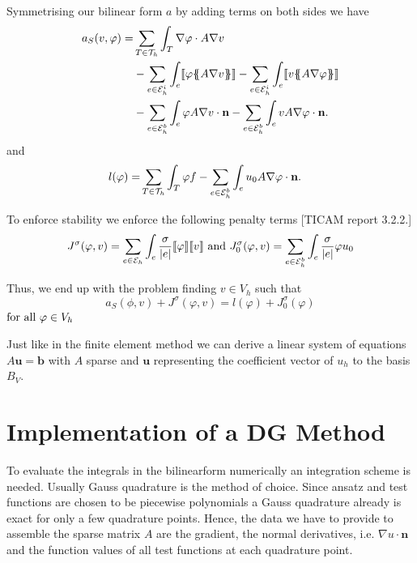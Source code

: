 Symmetrising our bilinear form $a$ by adding terms on both sides we have
\begin{align}
 a_S(v, \varphi) = &\sum\limits_{T \in \triang} \int_T \nabla \varphi \cdot A \nabla v \nonumber \\
  &-\sum\limits_{e \in \edgesi}\int_{e} \jump {\varphi \average{A \nabla v} }
 - \sum\limits_{e \in \edgesi}\int_{e} \jump{ v \average{ A \nabla \varphi}} \nonumber\\ 
 & - \sum\limits_{e \in \edgesb}\int_{e} \varphi A \nabla v \cdot \mathbf n 
    - \sum\limits_{e \in \edgesb}\int_{e} v A \nabla \varphi \cdot \mathbf n.
\end{align}
and 
\begin{align}
	l(\varphi) =& \sum\limits_{T \in \mathcal{T}_h} \int_T \varphi f -\sum\limits_{e \in \mathcal{E}_h^b}\int_{e} u_0 A \nabla \varphi \cdot \mathbf n.
\end{align} 


To enforce stability we enforce the following penalty terms [TICAM report 3.2.2.]
\begin{align}
	J^\sigma(\varphi, v) = \sum\limits_{e \in \mathcal{E}_h} \int_e \frac \sigma {|e|} \llbracket \varphi \rrbracket \llbracket v \rrbracket \textnormal{ and } 	J^\sigma_0(\varphi, v) = \sum\limits_{e \in \mathcal{E}_h^b} \int_e \frac \sigma {|e|} \varphi u_0  
\end{align}

Thus, we end up with the problem finding $v \in V_h$ such that
\[
	a_S(\phi,v) + J^\sigma(\varphi,v) = l(\varphi) + J^\sigma_0(\varphi)
\] 
$  \textnormal{for all } \varphi \in V_h$\

Just like in the finite element method we can derive a linear system of equations $A \mathbf{u} = \mathbf{b}$ with $A$ sparse and $\mathbf{u}$ representing the coefficient vector of $u_h$ to the basis $B_V$.  

\section{Implementation of a DG Method}
To evaluate the integrals in the bilinearform  numerically an integration scheme is needed. Usually Gauss quadrature is the method of choice. Since ansatz and test functions are chosen to be piecewise polynomials a Gauss quadrature already is exact for only a few quadrature points.
Hence, the data we have to provide to assemble the sparse matrix $A$ are the gradient, the normal derivatives, i.e. $\nabla u \cdot \mathbf{n}$ and the function values of all test functions at each quadrature point.

